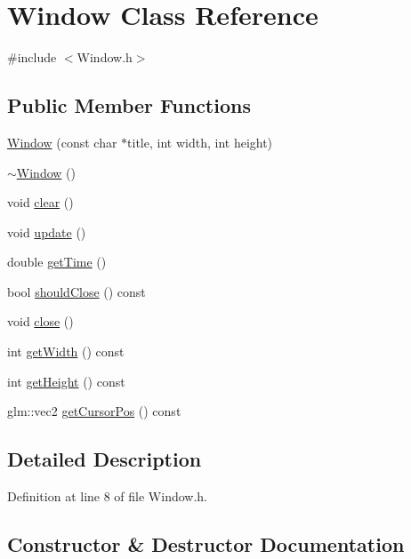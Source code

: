 \hypertarget{class_window}{}\section{Window Class Reference}
\label{class_window}


{\ttfamily \#include $<$Window.\+h$>$}

\subsection*{Public Member Functions}
\begin{DoxyCompactItemize}
\item 
\hyperlink{class_window_a315084d17424d10fe4a77c581084b65a}{Window} (const char $\ast$title, int width, int height)
\item 
\hyperlink{class_window_a245d821e6016fa1f6970ccbbedd635f6}{$\sim$\+Window} ()
\item 
void \hyperlink{class_window_a38bc43bdd1a97e5de7f346ba4c3957ef}{clear} ()
\item 
void \hyperlink{class_window_a59515fc5a56e86d5a46d771595daac55}{update} ()
\item 
double \hyperlink{class_window_a8a828ebd82becbc53c7754916be02b79}{get\+Time} ()
\item 
bool \hyperlink{class_window_a1caaf150558c0c35a8811f19ccac817d}{should\+Close} () const
\item 
void \hyperlink{class_window_a35055c04498121d39741bfcd5082705b}{close} ()
\item 
int \hyperlink{class_window_aee31a875d654a8c8f7d796d072657791}{get\+Width} () const
\item 
int \hyperlink{class_window_a60757b2b0dbcec9889e3a09f5655adbe}{get\+Height} () const
\item 
glm\+::vec2 \hyperlink{class_window_ab276bf3630d294d6eee8c5992b93e721}{get\+Cursor\+Pos} () const
\end{DoxyCompactItemize}


\subsection{Detailed Description}


Definition at line 8 of file Window.\+h.



\subsection{Constructor \& Destructor Documentation}
\mbox{\label{class_window_a315084d17424d10fe4a77c581084b65a}} 
